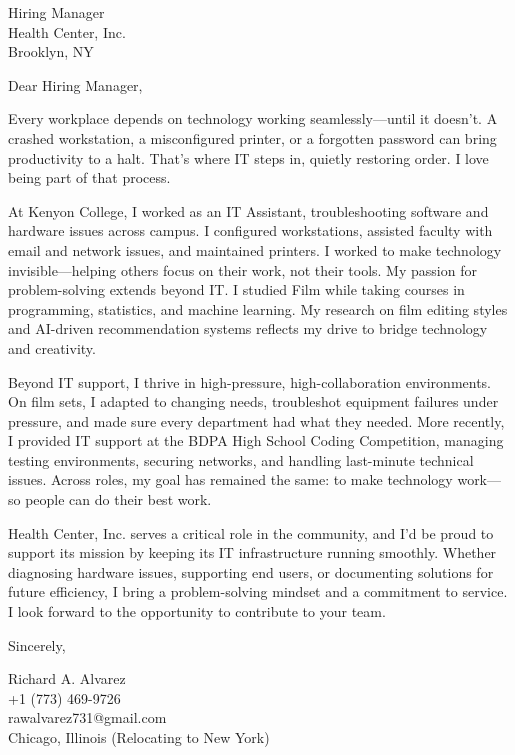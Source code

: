 \documentclass[a4paper,10pt]{letter}
\begin{document}
\begin{letter}{
Hiring Manager \\
Health Center, Inc. \\
Brooklyn, NY}

\opening{Dear Hiring Manager,}

Every workplace depends on technology working seamlessly—until it doesn’t. A crashed workstation, a misconfigured printer, or a forgotten password can bring productivity to a halt. That’s where IT steps in, quietly restoring order. I love being part of that process.

At Kenyon College, I worked as an IT Assistant, troubleshooting software and hardware issues across campus. I configured workstations, assisted faculty with email and network issues, and maintained printers. I worked to make technology invisible—helping others focus on their work, not their tools. My passion for problem-solving extends beyond IT. I studied Film while taking courses in programming, statistics, and machine learning. My research on film editing styles and AI-driven recommendation systems reflects my drive to bridge technology and creativity. 

Beyond IT support, I thrive in high-pressure, high-collaboration environments. On film sets, I adapted to changing needs, troubleshot equipment failures under pressure, and made sure every department had what they needed. More recently, I provided IT support at the BDPA High School Coding Competition, managing testing environments, securing networks, and handling last-minute technical issues. Across roles, my goal has remained the same: to make technology work—so people can do their best work.

Health Center, Inc. serves a critical role in the community, and I’d be proud to support its mission by keeping its IT infrastructure running smoothly. Whether diagnosing hardware issues, supporting end users, or documenting solutions for future efficiency, I bring a problem-solving mindset and a commitment to service. I look forward to the opportunity to contribute to your team.

\closing{Sincerely,}

Richard A. Alvarez \\
+1 (773) 469-9726 \\
rawalvarez731@gmail.com \\
Chicago, Illinois (Relocating to New York)

\end{letter}
\end{document}
